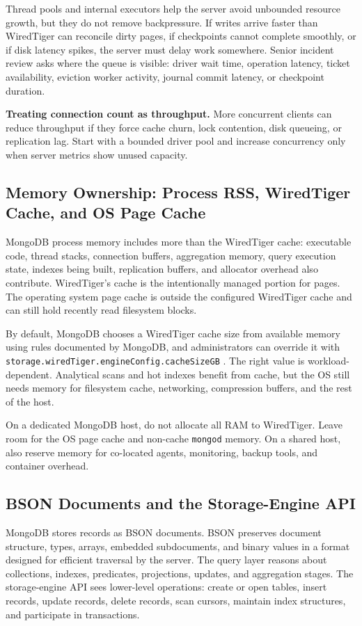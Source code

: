 Thread pools and internal executors help the server avoid unbounded resource growth, but they do not remove backpressure. If writes arrive faster than WiredTiger can reconcile dirty pages, if checkpoints cannot complete smoothly, or if disk latency spikes, the server must delay work somewhere. Senior incident review asks where the queue is visible: driver wait time, operation latency, ticket availability, eviction worker activity, journal commit latency, or checkpoint duration.

\begin{pitfall}
\textbf{Treating connection count as throughput.} More concurrent clients can reduce throughput if they force cache churn, lock contention, disk queueing, or replication lag. Start with a bounded driver pool and increase concurrency only when server metrics show unused capacity.
\end{pitfall}

\subsection{Memory Ownership: Process RSS, WiredTiger Cache, and OS Page Cache}
MongoDB process memory includes more than the WiredTiger cache: executable code, thread stacks, connection buffers, aggregation memory, query execution state, indexes being built, replication buffers, and allocator overhead also contribute. WiredTiger's cache is the intentionally managed portion for pages. The operating system page cache is outside the configured WiredTiger cache and can still hold recently read filesystem blocks.

By default, MongoDB chooses a WiredTiger cache size from available memory using rules documented by MongoDB, and administrators can override it with \texttt{storage.wiredTiger.engineConfig.cacheSizeGB} \cite{mongodbWiredTigerDocs}. The right value is workload-dependent. Analytical scans and hot indexes benefit from cache, but the OS still needs memory for filesystem cache, networking, compression buffers, and the rest of the host.

\begin{tipbox}
On a dedicated MongoDB host, do not allocate all RAM to WiredTiger. Leave room for the OS page cache and non-cache \texttt{mongod} memory. On a shared host, also reserve memory for co-located agents, monitoring, backup tools, and container overhead.
\end{tipbox}

\subsection{BSON Documents and the Storage-Engine API}
MongoDB stores records as BSON documents. BSON preserves document structure, types, arrays, embedded subdocuments, and binary values in a format designed for efficient traversal by the server. The query layer reasons about collections, indexes, predicates, projections, updates, and aggregation stages. The storage-engine API sees lower-level operations: create or open tables, insert records, update records, delete records, scan cursors, maintain index structures, and participate in transactions.

